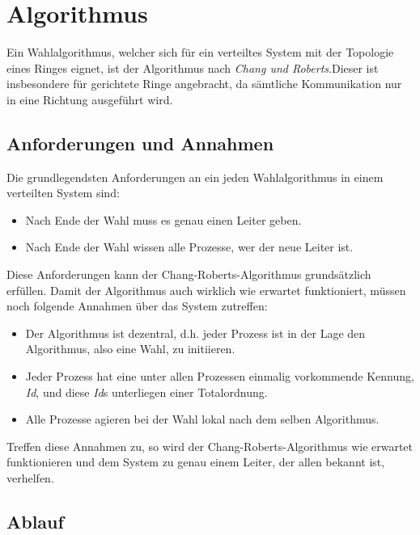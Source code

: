 \section{Algorithmus}

Ein Wahlalgorithmus, welcher sich für ein verteiltes System mit der Topologie eines Ringes eignet, ist der Algorithmus nach 
\textit{Chang und Roberts}\cite{ChangRoberts79}.Dieser ist insbesondere für gerichtete Ringe angebracht, da sämtliche Kommunikation 
nur in eine Richtung ausgeführt wird.


\subsection{Anforderungen und Annahmen}
\label{sec:anf-an}

Die grundlegendsten Anforderungen an ein jeden Wahlalgorithmus in einem verteilten System sind:
\begin{itemize}
    \item Nach Ende der Wahl muss es genau einen Leiter geben.
    \item Nach Ende der Wahl wissen alle Prozesse, wer der neue Leiter ist.
\end{itemize}

Diese Anforderungen kann der Chang-Roberts-Algorithmus grundsätzlich erfüllen. Damit der Algorithmus auch wirklich wie erwartet funktioniert, müssen
noch folgende Annahmen über das System zutreffen\cite{bonakdarpur}:
\begin{itemize}
    \item Der Algorithmus ist dezentral, d.h. jeder Prozess ist in der Lage den Algorithmus, also eine Wahl, zu initiieren.
    \item Jeder Prozess hat eine unter allen Prozessen einmalig vorkommende Kennung, \textit{Id}, und diese \textit{Id}s unterliegen einer Totalordnung. 
    \item Alle Prozesse agieren bei der Wahl lokal nach dem selben Algorithmus.
\end{itemize}

Treffen diese Annahmen zu, so wird der Chang-Roberts-Algorithmus wie erwartet funktionieren 
und dem System zu genau einem Leiter, der allen bekannt ist, verhelfen.

\subsection{Ablauf}
\label{sec:ablauf}

